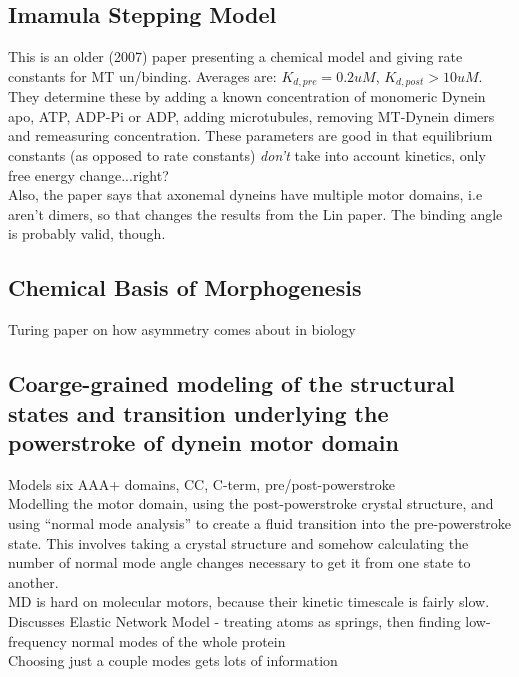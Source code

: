 \documentclass[10pt]{article} %
\begin{document}
\subsection{Imamula Stepping Model}
This is an older (2007) paper presenting a chemical model and giving rate constants for MT un/binding. Averages are: $K_{d,pre} = 0.2uM$, $K_{d,post} > 10uM$. They determine these by adding a known concentration of monomeric Dynein apo, ATP, ADP-Pi or ADP, adding microtubules, removing MT-Dynein dimers and remeasuring concentration. These parameters are good in that equilibrium constants (as opposed to rate constants) \textit{don't} take into account kinetics, only free energy change...right?\\

Also, the paper says that axonemal dyneins have multiple motor domains, i.e aren't dimers, so that changes the results from the Lin paper. The binding angle is probably valid, though.\\

\subsection{Chemical Basis of Morphogenesis}
Turing paper on how asymmetry comes about in biology\\

\subsection{Coarge-grained modeling of the structural states and transition underlying the powerstroke of dynein motor domain}
Models six AAA+ domains, CC, C-term, pre/post-powerstroke\\

Modelling the motor domain, using the post-powerstroke crystal structure, and using ``normal mode analysis'' to create a fluid transition into the pre-powerstroke state. This involves taking a crystal structure and somehow calculating the number of normal mode angle changes necessary to get it from one state to another.\\

MD is hard on molecular motors, because their kinetic timescale is fairly slow.\\

Discusses Elastic Network Model - treating atoms as springs, then finding low-frequency normal modes of the whole protein\\

Choosing just a couple modes gets lots of information
\end{document}
